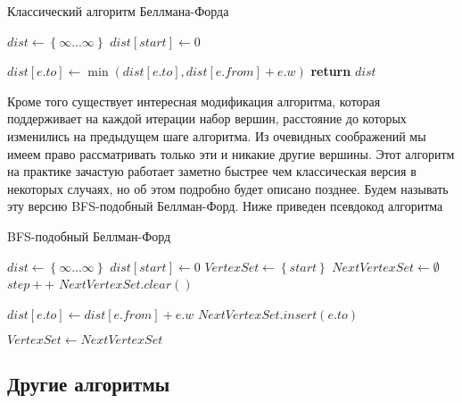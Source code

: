 \FloatBarrier
\begin{algorithm}
\caption{Классический алгоритм Беллмана-Форда}\label{bf_classic_seq}
\begin{algorithmic}[1]
\State $dist\gets \left\{ {\infty ... \infty}\right\}$
\State $dist[start] \gets 0$
 
		\State $dist[e.to] \gets \min(dist[e.to], dist[e.from] + e.w)$
	\EndFor
\EndFor
\State \textbf{return} $dist$
\EndProcedure
\end{algorithmic}
\end{algorithm}

\FloatBarrier
Кроме того существует интересная модификация алгоритма, которая поддерживает на каждой итерации набор вершин, расстояние до которых изменились на предыдущем шаге алгоритма. Из очевидных соображений мы имеем право рассматривать только эти и никакие другие вершины. Этот алгоритм на практике зачастую работает заметно быстрее чем классическая версия в некоторых случаях, но об этом подробно будет описано позднее. Будем называть эту версию BFS-подобный Беллман-Форд. Ниже приведен псевдокод алгоритма 

\FloatBarrier
\begin{algorithm}
\caption{BFS-подобный Беллман-Форд}\label{bf_classic_seq}
\begin{algorithmic}[1]
\State $dist\gets \left\{ {\infty ... \infty}\right\}$
\State $dist[start] \gets 0$
\State $VertexSet \gets \left\{ {start}\right\}$ 
\State $NextVertexSet \gets \emptyset$ 
	\State $step++$
	\State $NextVertexSet.clear()$
	
		  
				\State $dist[e.to] \gets dist[e.from] + e.w$
				\State $NextVertexSet.insert(e.to)$								
			\EndIf
		\EndFor
	\EndFor
	
	\State $VertexSet \gets NextVertexSet$	
\EndWhile

\EndProcedure
\end{algorithmic}
\end{algorithm}

\FloatBarrier
\subsection{Другие алгоритмы}

